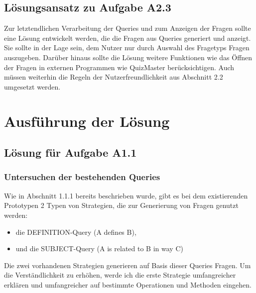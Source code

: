 \documentclass[headsepline,titlepage,ngerman,twoside,12pt]{report}
\newcommand\todo[1]{}%
\begin{document}
\section{Lösungsansatz zu Aufgabe A2.3}
Zur letztendlichen Verarbeitung der Queries und zum Anzeigen der Fragen sollte eine Lösung entwickelt werden, die die Fragen aus Queries generiert und anzeigt.
Sie sollte in der Lage sein, dem Nutzer nur durch Auswahl des Fragetyps Fragen auszugeben.
Darüber hinaus sollte die Lösung weitere Funktionen wie das Öffnen der Fragen in externen Programmen wie QuizMaster berücksichtigen.
Auch müssen weiterhin die Regeln der Nutzerfreundlichkeit aus Abschnitt 2.2 umgesetzt werden.



\chapter{Ausführung der Lösung}
\section{Lösung für Aufgabe A1.1}
\subsection{Untersuchen der bestehenden Queries}
\todo{Tatsächlichen Referrer zu 1.1.1 hinzufügen}
Wie in Abschnitt 1.1.1 bereits beschrieben wurde, gibt es bei dem existierenden Prototypen 2 Typen von Strategien, die zur Generierung von Fragen genutzt werden:
\begin{itemize}
\item die DEFINITION-Query (A defines B),
\item und die SUBJECT-Query (A is related to B in way C)
\end{itemize}
Die zwei vorhandenen Strategien generieren auf Basis dieser Queries Fragen.
Um die Verständlichkeit zu erhöhen, werde ich die erste Strategie umfangreicher erklären und umfangreicher auf bestimmte Operationen und Methoden eingehen.
\end{document}
